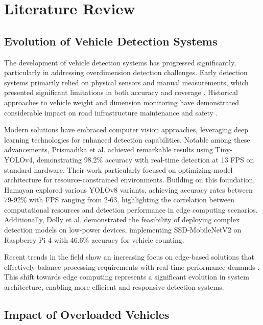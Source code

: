 \section{Literature Review}
\label{sec:literaturereview}

\subsection{Evolution of Vehicle Detection Systems}

The development of vehicle detection systems has progressed significantly, particularly in addressing overdimension detection challenges. Early detection systems primarily relied on physical sensors and manual measurements, which presented significant limitations in both accuracy and coverage \cite{Priambudi2020Pre-study}. Historical approaches to vehicle weight and dimension monitoring have demonstrated considerable impact on road infrastructure maintenance and safety \cite{cebon1989assessment, huang2004pavement}.

Modern solutions have embraced computer vision approaches, leveraging deep learning technologies for enhanced detection capabilities. Notable among these advancements, Prismadika et al. \cite{prismadika2023} achieved remarkable results using Tiny-YOLOv4, demonstrating 98.2\% accuracy with real-time detection at 13 FPS on standard hardware. Their work particularly focused on optimizing model architecture for resource-constrained environments. Building on this foundation, Hamayan \cite{hamayan2024} explored various YOLOv8 variants, achieving accuracy rates between 79-92\% with FPS ranging from 2-63, highlighting the correlation between computational resources and detection performance in edge computing scenarios. Additionally, Dolly et al. \cite{dolly2023} demonstrated the feasibility of deploying complex detection models on low-power devices, implementing SSD-MobileNetV2 on Raspberry Pi 4 with 46.6\% accuracy for vehicle counting.

Recent trends in the field show an increasing focus on edge-based solutions that effectively balance processing requirements with real-time performance demands \cite{Chen2023Edge, aws2024}. This shift towards edge computing represents a significant evolution in system architecture, enabling more efficient and responsive detection systems.

\subsection{Impact of Overloaded Vehicles}


